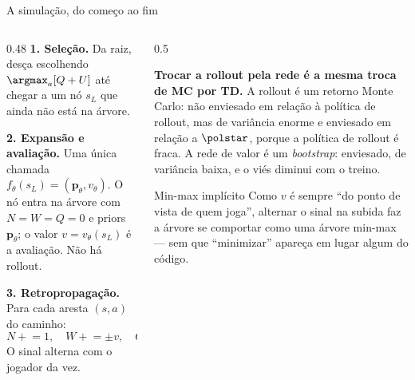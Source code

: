 \documentclass[aspectratio=169, 10pt]{beamer}
\newcommand{\Nvis}{N}
\newcommand{\Wtot}{W}
\newcommand{\redeval}{v_{\theta}}
\newcommand{\redepol}{\bm{p}_{\theta}}
\begin{document}
\begin{frame}{A simulação, do começo ao fim}
  \small
  \begin{columns}[T]
    \begin{column}{0.48\textwidth}
      \textbf{1. Seleção.} Da raiz, desça escolhendo $\argmax_a [Q+U]$ até chegar
      a um nó $s_L$ que ainda não está na árvore.

      \medskip
      \textbf{2. Expansão e avaliação.} Uma única chamada
      $f_{\theta}(s_L) = (\redepol, \redeval)$. O nó entra na árvore com
      $\Nvis=\Wtot=Q=0$ e priors $\redepol$; o valor $v = \redeval(s_L)$ é a
      avaliação. \alert{Não há rollout.}

      \medskip
      \textbf{3. Retropropagação.} Para cada aresta $(s,a)$ do caminho:
      \[
        \Nvis \mathrel{+}= 1, \quad
        \Wtot \mathrel{+}= \pm v, \quad
        Q = \Wtot/\Nvis .
      \]
      O sinal alterna com o jogador da vez.
    \end{column}
    \begin{column}{0.5\textwidth}
      \begin{ideiabox}
        \textbf{Trocar a rollout pela rede é a mesma troca de MC por TD.}
        A rollout é um retorno Monte Carlo: não enviesado em relação à política de
        rollout, mas de variância enorme e enviesado em relação a $\polstar$,
        porque a política de rollout é fraca. A rede de valor é um
        \emph{bootstrap}: enviesado, de variância baixa, e o viés diminui com o
        treino.
      \end{ideiabox}
      \begin{defbox}{Min-max implícito}
        Como $v$ é sempre ``do ponto de vista de quem joga'', alternar o sinal na
        subida faz a árvore se comportar como uma árvore min-max — sem que
        ``minimizar'' apareça em lugar algum do código.
      \end{defbox}
    \end{column}
  \end{columns}
\end{frame}
\end{document}
